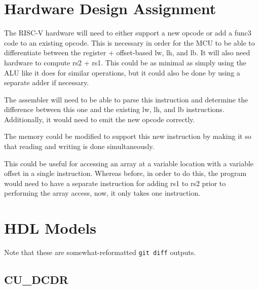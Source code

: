 \documentclass{article}
\begin{document}
\pagebreak

\section{Hardware Design Assignment}

The RISC-V hardware will need to either support a new opcode or add a func3 code to an existing opcode. This is necessary in order for the MCU to be able to differentiate between the register + offset-based lw, lh, and lb. It will also need hardware to compute rs2 + rs1. This could be as minimal as simply using the ALU like it does for similar operations, but it could also be done by using a separate adder if necessary.

The assembler will need to be able to parse this instruction and determine the difference between this one and the existing lw, lh, and lb instructions. Additionally, it would need to emit the new opcode correctly.

The memory could be modified to support this new instruction by making it so that reading and writing is done simultaneously.

This could be useful for accessing an array at a variable location with a variable offset in a single instruction. Whereas before, in order to do this, the program would need to have a separate instruction for adding rs1 to rs2 prior to performing the array access, now, it only takes one instruction. 

\pagebreak

\section{HDL Models}
Note that these are somewhat-reformatted \texttt{git diff} outputs.

\subsection{CU\_DCDR}
\end{document}
